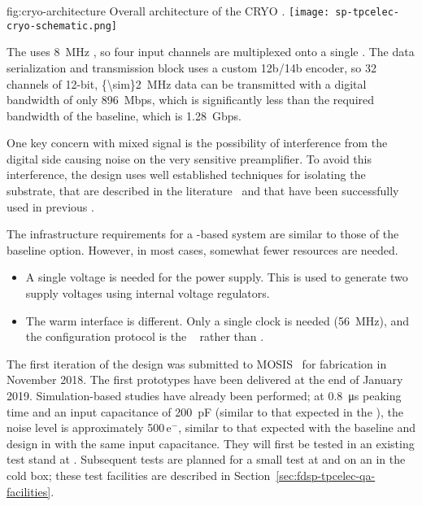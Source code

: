 \begin{dunefigure}
{fig:cryo-architecture}
{Overall architecture of the CRYO .}
\texttt{[image: sp-tpcelec-cryo-schematic.png]}
\end{dunefigure}

The  uses \SI{8}{MHz} , so four input channels are 
multiplexed onto a single . The data serialization and transmission 
block uses a custom 12b/14b encoder, so \num{32} channels of \num{12}-bit, 
\SI{{\sim}2}{MHz} data can be transmitted with a digital bandwidth of 
only \SI{896}{Mbps}, which is significantly less than the required bandwidth 
of the baseline, which is \SI{1.28}{Gbps}.

One key concern with mixed signal  is the possibility of 
interference from the digital side causing noise on the very sensitive 
preamplifier. To avoid this interference, the  design 
uses well established techniques for isolating the substrate, that are 
described in the literature~\cite{yeh} and that have been successfully 
used in previous .

The infrastructure requirements for a  -based 
system are similar to those of the baseline option. However, in most 
cases, somewhat fewer resources are needed.
\begin{itemize}
\item{A single voltage is needed for the power supply. This is used to 
generate two supply voltages using internal voltage regulators.}
\item{The warm interface is different. Only a single clock is 
needed (\SI{56}{MHz}), and the configuration protocol is the 
~\cite{SACI} rather than .}
\end{itemize}

The first iteration of the   design was 
submitted to MOSIS~\cite{mosis} for fabrication in November 2018.  
The first prototypes have been delivered at the end of January 2019. Simulation-based 
studies have already been performed; at \SI{0.8}{\micro\second} peaking 
time and an input capacitance of \SI{200}{pF} (similar to that expected 
in the  ), the noise level is approximately 
\num{500}\,e$^-$, similar to that expected with the 
baseline  and   design in  
with the same input capacitance.  They will first be tested in an existing 
test stand at . Subsequent tests are planned for a small test 
 at  and on an  in the  
cold box; these test facilities are described in 
Section~\ref{sec:fdsp-tpcelec-qa-facilities}.

